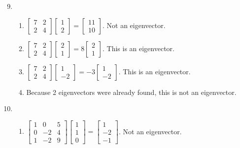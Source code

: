 \documentclass[12pt]{article}
\begin{document}
\begin{enumerate}
    \setcounter{enumi}{8}

  \item 

    \begin{enumerate}

      \item $\begin{bmatrix} 7 & 2\\ 2 & 4\end{bmatrix}\begin{bmatrix} 1\\2\end{bmatrix}=\begin{bmatrix} 11\\ 10\end{bmatrix}$. Not an eigenvector.

      \item $\begin{bmatrix} 7 & 2\\ 2 & 4\end{bmatrix}\begin{bmatrix} 2\\1\end{bmatrix}=8\begin{bmatrix} 2\\1\end{bmatrix}$. This is an eigenvector.

      \item $\begin{bmatrix} 7 & 2\\ 2 & 4\end{bmatrix}\begin{bmatrix} 1\\-2\end{bmatrix}=-3\begin{bmatrix}1\\-2\end{bmatrix}$. This is an eigenvector.

      \item Because 2 eigenvectors were already found, this is not an eigenvector.

    \end{enumerate}

    \setcounter{enumi}{11}

  \item 

    \begin{enumerate}

      \item $\begin{bmatrix} 1 & 0 & 5\\ 0 & -2 & 4\\ 1 & -2 & 9\end{bmatrix}\begin{bmatrix} 1\\1\\0\end{bmatrix}=\begin{bmatrix} 1\\-2\\-1\end{bmatrix}$. Not an eigenvector.


\end{enumerate}
\end{enumerate}
\end{document}
